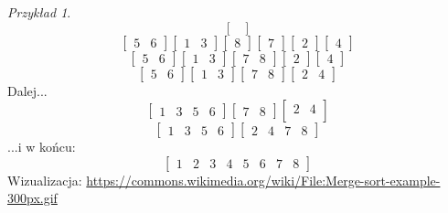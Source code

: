 \documentclass[10pt, oneside]{article}
\theoremstyle{remark}
\newtheorem*{example}{Przykład}
\begin{document}
\begin{example}
$$\begin{bmatrix}
\end{bmatrix}$$
$$\begin{bmatrix}
	5 & 6 \end{bmatrix} \begin{bmatrix} 1 & 3 \end{bmatrix} \begin{bmatrix} 8 \end{bmatrix} \begin{bmatrix} 7 \end{bmatrix} \begin{bmatrix} 2 \end{bmatrix} \begin{bmatrix} 4
\end{bmatrix}$$
$$\begin{bmatrix}
	5 & 6 \end{bmatrix} \begin{bmatrix} 1 & 3 \end{bmatrix} \begin{bmatrix} 7 & 8 \end{bmatrix} \begin{bmatrix} 2 \end{bmatrix} \begin{bmatrix} 4
\end{bmatrix}$$
$$\begin{bmatrix}
	5 & 6 \end{bmatrix} \begin{bmatrix} 1 & 3 \end{bmatrix} \begin{bmatrix} 7 & 8 \end{bmatrix} \begin{bmatrix} 2 & 4
\end{bmatrix}$$
Dalej...
$$\begin{bmatrix}
	1 & 3 & 5 & 6  \end{bmatrix} \begin{bmatrix} 7 & 8 \end{bmatrix} \begin{bmatrix} 2 & 4\\
\end{bmatrix}$$
$$\begin{bmatrix}
	1 & 3 & 5 & 6  \end{bmatrix} \begin{bmatrix} 2 & 4 & 7 & 8 
\end{bmatrix}$$
...i w końcu:
$$\begin{bmatrix}
	1 & 2 & 3 & 4 & 5 &6 & 7 & 8
\end{bmatrix}$$
Wizualizacja: \url{https://commons.wikimedia.org/wiki/File:Merge-sort-example-300px.gif}
\end{example}
\end{document}

